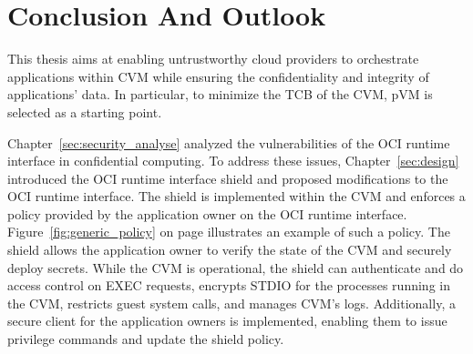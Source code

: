 \chapter{Conclusion And Outlook}
\label{sec:conclusion}





This thesis aims at enabling untrustworthy cloud providers to orchestrate applications within \acrshort{CVM} while ensuring the confidentiality and integrity of applications' data. In particular, to minimize the \acrshort{TCB} of the CVM, \acrshort{pVM} is selected as a starting point.
 
Chapter~\ref{sec:security_analyse} analyzed the vulnerabilities of the OCI runtime interface in confidential computing. To address these issues, Chapter~\ref{sec:design} introduced the OCI runtime interface shield and proposed modifications to the OCI runtime interface. The shield is implemented 
within the \acrshort{CVM} and enforces a policy provided by the application owner on the OCI runtime interface. Figure~\ref{fig:generic_policy} on page \pageref{fig:generic_policy} illustrates an example of such a policy. The shield allows the application owner to verify the state of the \acrshort{CVM}
and securely deploy secrets. While the \acrshort{CVM} is operational, the shield can authenticate and do access control on EXEC requests, encrypts STDIO for the processes running in the \acrshort{CVM}, restricts guest system calls, and manages \acrshort{CVM}'s logs. Additionally, a 
secure client for the application owners is implemented, enabling them to issue privilege commands and update the shield policy.
 
